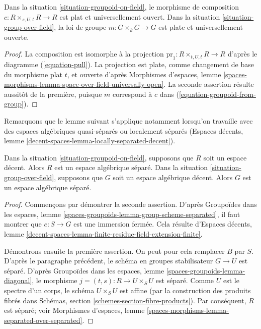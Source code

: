\begin{lemma}
\label{lemma-groupoid-on-field-open-multiplication}
Dans la
situation \ref{situation-groupoid-on-field},
le morphisme de composition $c : R \times_{s, U, t} R \to R$ est plat et
universellement ouvert.
Dans la
situation \ref{situation-group-over-field},
la loi de groupe $m : G \times_k G \to G$ est plate et
universellement ouverte.
\end{lemma}

\begin{proof}
La composition est isomorphe à la projection
$\text{pr}_1 : R \times_{t, U, t} R \to R$ d'après le
diagramme (\ref{equation-pull}).
La projection est plate, comme changement de base du morphisme plat $t$,
et ouverte d'après
Morphismes d'espaces,
lemme \ref{spaces-morphisms-lemma-space-over-field-universally-open}.
La seconde assertion résulte aussitôt de la première, puisque
$m$ correspond à $c$ dans (\ref{equation-groupoid-from-group}).
\end{proof}

\noindent
Remarquons que le lemme suivant s'applique notamment lorsqu'on travaille
avec des espaces algébriques quasi-séparés ou localement séparés
(Espaces décents, lemme \ref{decent-spaces-lemma-locally-separated-decent}).

\begin{lemma}
\label{lemma-group-scheme-over-field-separated}
Dans la situation \ref{situation-groupoid-on-field},
supposons que $R$ soit un espace décent. Alors $R$ est un espace algébrique séparé.
Dans la situation \ref{situation-group-over-field}, supposons que
$G$ soit un espace algébrique décent. Alors $G$ est un espace algébrique séparé.
\end{lemma}

\begin{proof}
Commençons par démontrer la seconde assertion. D'après Groupoïdes dans les espaces,
lemme \ref{spaces-groupoids-lemma-group-scheme-separated},
il faut montrer que $e : S \to G$ est une immersion fermée.
Cela résulte d'Espaces décents, lemme
\ref{decent-spaces-lemma-finite-residue-field-extension-finite}.

\medskip\noindent
Démontrons ensuite la première assertion. On peut pour cela remplacer $B$ par $S$.
D'après le paragraphe précédent, le schéma en groupes stabilisateur $G \to U$ est séparé. D'après
Groupoïdes dans les espaces, lemme \ref{spaces-groupoids-lemma-diagonal},
le morphisme $j = (t, s) : R \to U \times_S U$ est séparé.
Comme $U$ est le spectre d'un corps, le schéma
$U \times_S U$ est affine (par la construction des produits fibrés dans
Schémas, section \ref{schemes-section-fibre-products}).
Par conséquent, $R$ est séparé; voir
Morphismes d'espaces, lemme
\ref{spaces-morphisms-lemma-separated-over-separated}.
\end{proof}

